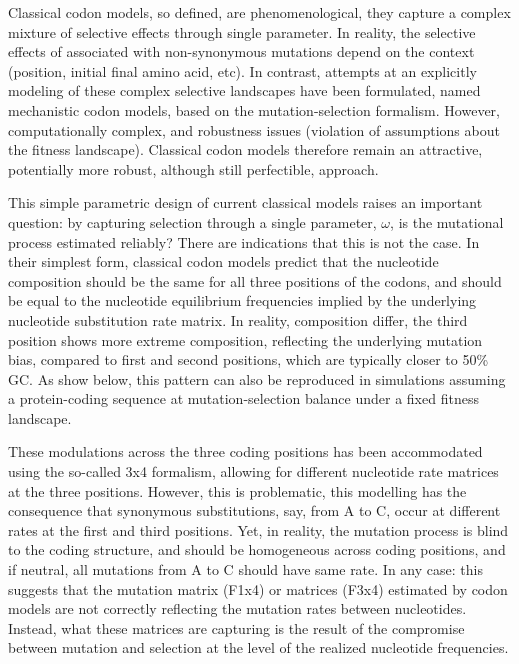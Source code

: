 Classical codon models, so defined, are phenomenological, they capture a complex mixture of selective effects through single parameter.
In reality, the selective effects of associated with non-synonymous mutations depend on the context (position, initial final amino acid, etc).
In contrast, attempts at an explicitly modeling of these complex selective landscapes have been formulated, named mechanistic codon models, based on the mutation-selection formalism.
However, computationally complex, and robustness issues (violation of assumptions about the fitness landscape).
Classical codon models therefore remain an attractive, potentially more robust, although still perfectible, approach.

This simple parametric design of current classical models raises an important question: by capturing selection through a single parameter, $\omega$, is the mutational process estimated reliably?
There are indications that this is not the case.
In their simplest form, classical codon models predict that the nucleotide composition should be the same for all three positions of the codons, and should be equal to the nucleotide equilibrium frequencies implied by the underlying nucleotide substitution rate matrix.
In reality, composition differ, the third position shows more extreme composition, reflecting the underlying mutation bias, compared to first and second positions, which are typically closer to 50\% GC.
As show below, this pattern can also be reproduced in simulations assuming a protein-coding sequence at mutation-selection balance under a fixed fitness landscape.

These modulations across the three coding positions has been accommodated using the so-called 3x4 formalism, allowing for different nucleotide rate matrices at the three positions.
However, this is problematic, this modelling has the consequence that synonymous substitutions, say, from A to C, occur at different rates at the first and third positions.
Yet, in reality, the mutation process is blind to the coding structure, and should be homogeneous across coding positions, and if neutral, all mutations from A to C should have same rate.
In any case: this suggests that the mutation matrix (F1x4) or matrices (F3x4) estimated by codon models are not correctly reflecting the mutation rates between nucleotides.
Instead, what these matrices are capturing is the result of the compromise between mutation and selection at the level of the realized nucleotide frequencies.

